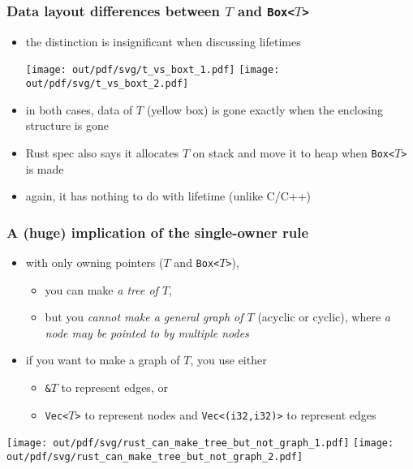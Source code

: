\documentclass[12pt,dvipdfmx]{beamer}
\newcommand{\ao}[1]{{\color{blue}#1}}
\newcommand{\aka}[1]{{\color{red}#1}}
\begin{document}
\begin{frame}
  \frametitle{Data layout differences between $T$ and {\tt Box<$T$>}}
  \begin{itemize}
  \item the distinction is insignificant when discussing lifetimes
    \begin{center}
      \texttt{[image: out/pdf/svg/t\_vs\_boxt\_1.pdf]}
      \hspace{1cm}
      \texttt{[image: out/pdf/svg/t\_vs\_boxt\_2.pdf]}
    \end{center}
  \item in both cases, data of $T$ (yellow box) is gone exactly when
    the enclosing structure is gone
  \item Rust spec also says it allocates $T$ on stack and
    move it to heap when {\tt Box<$T$>} is made
  \item again, it has nothing to do with lifetime (unlike C/C++)
  \end{itemize}
\end{frame}

\begin{frame}
  \frametitle{A (huge) implication of the single-owner rule}
  \begin{itemize}
  \item with only owning pointers ($T$ and {\tt Box<$T$>}), 
    \begin{itemize}
    \item you can make \ao{\it a tree of $T$}, 
    \item but you \aka{\it cannot make a general graph of $T$}
      (acyclic or cyclic),
      where {\it a node may be pointed to by multiple nodes}
    \end{itemize}
  \item if you want to make a graph of $T$, you use either 
    \begin{itemize}
    \item {\tt \&$T$} to represent edges, or
    \item {\tt Vec<$T$>} to represent nodes and {\tt Vec<(i32,i32)>}
      to represent edges
    \end{itemize}
  \end{itemize}

  \begin{center}
\texttt{[image: out/pdf/svg/rust\_can\_make\_tree\_but\_not\_graph\_1.pdf]}
\texttt{[image: out/pdf/svg/rust\_can\_make\_tree\_but\_not\_graph\_2.pdf]}
  \end{center}
\end{frame}
\end{document}
